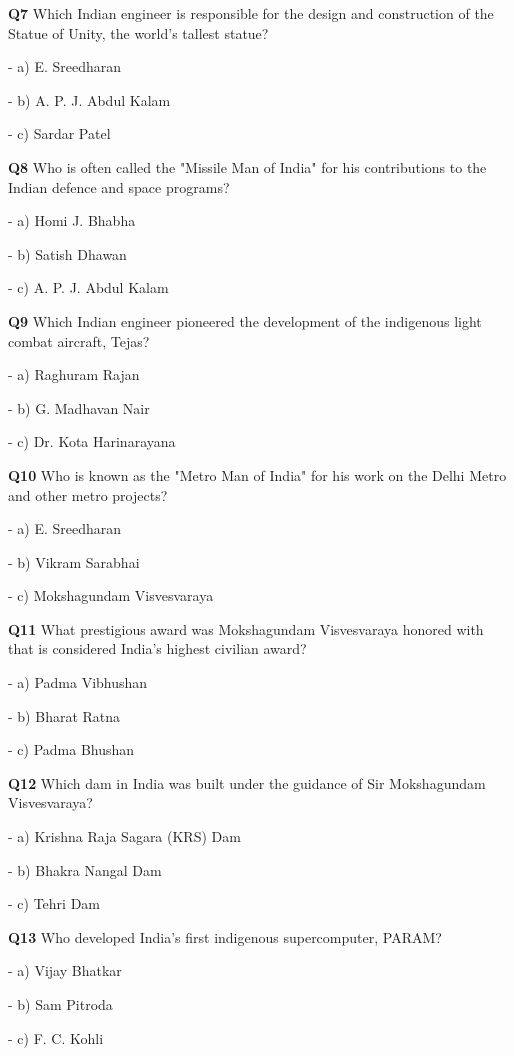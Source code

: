 \textbf{Q7} Which Indian engineer is responsible for the design and construction of the Statue of Unity, the world's tallest statue?\par
\quad - a) E. Sreedharan\par
\quad - b) A. P. J. Abdul Kalam\par
\quad - c) Sardar Patel\par

\textbf{Q8} Who is often called the "Missile Man of India" for his contributions to the Indian defence and space programs?\par
\quad - a) Homi J. Bhabha\par
\quad - b) Satish Dhawan\par
\quad - c) A. P. J. Abdul Kalam\par

\textbf{Q9} Which Indian engineer pioneered the development of the indigenous light combat aircraft, Tejas?\par
\quad - a) Raghuram Rajan\par
\quad - b) G. Madhavan Nair\par
\quad - c) Dr. Kota Harinarayana\par

\textbf{Q10} Who is known as the "Metro Man of India" for his work on the Delhi Metro and other metro projects?\par
\quad - a) E. Sreedharan\par
\quad - b) Vikram Sarabhai\par
\quad - c) Mokshagundam Visvesvaraya\par

\textbf{Q11} What prestigious award was Mokshagundam Visvesvaraya honored with that is considered India's highest civilian award?\par
\quad - a) Padma Vibhushan\par
\quad - b) Bharat Ratna\par
\quad - c) Padma Bhushan\par

\textbf{Q12} Which dam in India was built under the guidance of Sir Mokshagundam Visvesvaraya?\par
\quad - a) Krishna Raja Sagara (KRS) Dam\par
\quad - b) Bhakra Nangal Dam\par
\quad - c) Tehri Dam\par

\textbf{Q13} Who developed India's first indigenous supercomputer, PARAM?\par
\quad - a) Vijay Bhatkar\par
\quad - b) Sam Pitroda\par
\quad - c) F. C. Kohli\par

